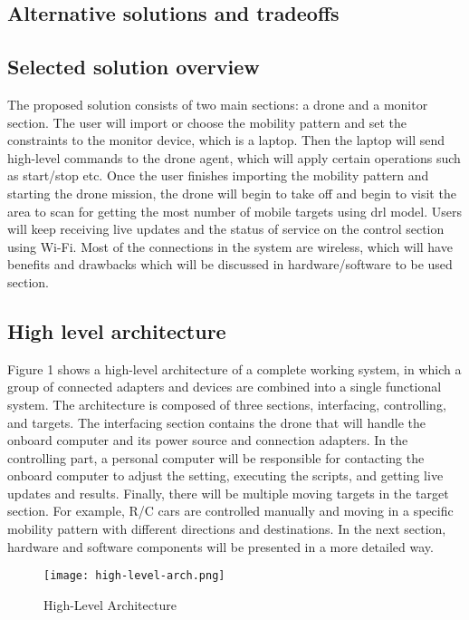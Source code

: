 \documentclass[../main.tex]{subfiles}
\begin{document}
\subsection{Alternative solutions and tradeoffs}

\subsection{Selected solution overview}

The proposed solution consists of two main sections: a drone and a monitor section. The user will import or choose 
the mobility pattern and set the constraints to the monitor device, which is a laptop. Then the laptop will send high-level commands to the drone agent, which will apply certain operations such as start/stop etc. Once the user finishes importing the mobility pattern and starting the drone mission, the drone will begin to take off and begin to visit the area to scan for getting the most number of mobile targets using \gls{drl} model. Users will keep receiving live updates and the status of service on the control section using Wi-Fi. Most of the connections in the system are wireless, which will have benefits and drawbacks which will be discussed in hardware/software to be used section.


\subsection{High level architecture}
Figure 1 shows a high-level architecture of a complete working system, in which a group of connected adapters and devices are combined into a single functional system. The architecture is composed of three sections, interfacing, controlling, and targets. The interfacing section contains the drone that will handle the onboard computer and its power source and connection adapters. In the controlling part, a personal computer will be responsible for contacting the onboard computer to adjust the setting, executing the scripts, and getting live updates and results. Finally, there will be multiple moving targets in the target section. For example, R/C cars are controlled manually and moving in a specific mobility pattern with different directions and destinations. In the next section, hardware and software components will be presented in a more detailed way.

\begin{figure}[H]
	\centering
	\texttt{[image: high-level-arch.png]}
	\caption{High-Level Architecture}\label{fig1:arch-fig}
\end{figure}
\end{document}
